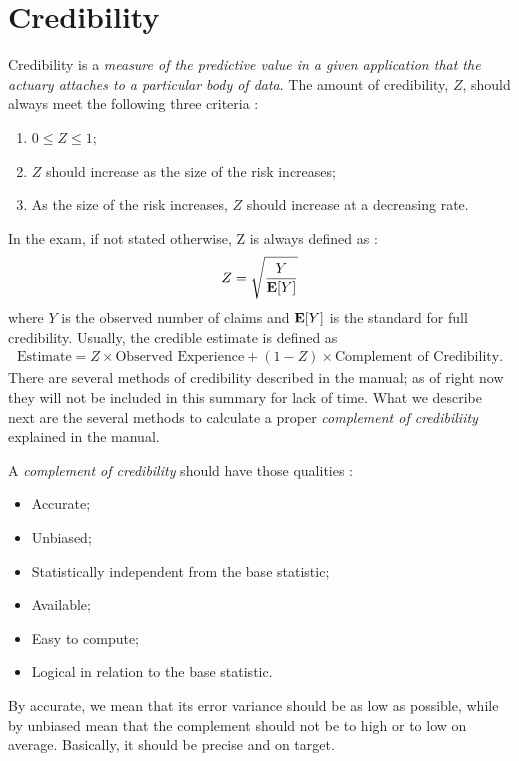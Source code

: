 \documentclass[11pt, english]{memoir}
\numberwithin{definition}{section}
\newcommand{\E}{\text{\textbf{E}}}
\begin{document}
\chapter{Credibility}

Credibility is a \emph{measure of the predictive value in a given application that the actuary attaches to a particular body of data}. The amount of credibility, $ Z $, should always meet the following three criteria : 
\begin{enumerate}[]
	\item $ 0 \leq Z \leq 1  $;
	\item $ Z $ should increase as the size of the risk increases;
	\item As the size of the risk increases, $ Z $ should increase at a decreasing rate.
\end{enumerate}
In the exam, if not stated otherwise, Z is always defined as : 
\begin{align*}
Z = \sqrt{\frac{Y}{\E[Y]}}
\end{align*}
where $ Y $ is the observed number of claims and $ \E[Y] $ is the standard for full credibility. Usually, the credible estimate is defined as 
\begin{align*}
\text{Estimate} = Z \times \text{Observed Experience} + (1-Z)\times \text{Complement of Credibility}.
\end{align*}
There are several methods of credibility described in the manual; as of right now they will not be included in this summary for lack of time. What we describe next are the several methods to calculate a proper \emph{complement of credibiliity} explained in the manual. 

A \emph{complement of credibility} should have those qualities : 
\begin{itemize}
	\item Accurate;
	\item Unbiased;
	\item Statistically independent from the base statistic;
	\item Available;
	\item Easy to compute;
	\item Logical in relation to the base statistic.
\end{itemize}
By accurate, we mean that its error variance should be as low as possible, while by unbiased mean that the complement should not be to high or to low on average. Basically, it should be precise and on target.  
\end{document}

